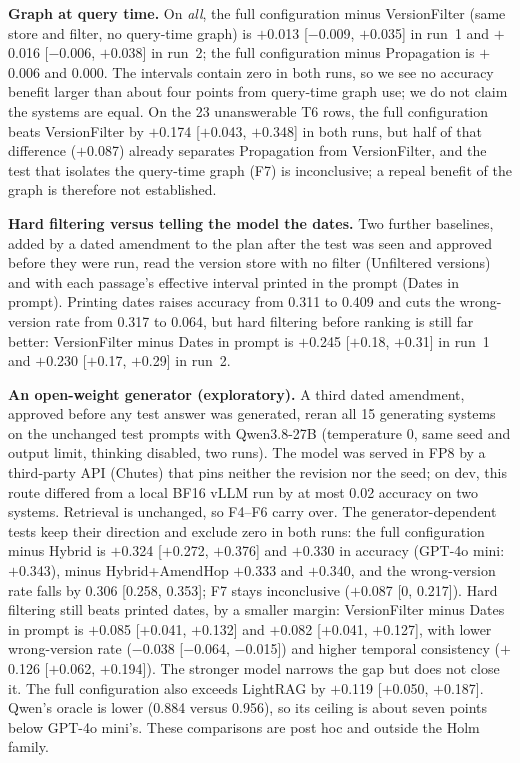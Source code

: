 \documentclass[sigconf,anonymous,review]{acmart}
\newcommand{\sys}[1]{\textsf{#1}}
\begin{document}
\textbf{Graph at query time.} On \textit{all}, the full configuration minus \sys{VersionFilter} (same store and filter, no query-time graph) is $+$0.013 [$-$0.009, $+$0.035] in run~1 and $+$0.016 [$-$0.006, $+$0.038] in run~2; the full configuration minus \sys{Propagation} is $+$0.006 and 0.000. The intervals contain zero in both runs, so we see no accuracy benefit larger than about four points from query-time graph use; we do not claim the systems are equal. On the 23 unanswerable T6 rows, the full configuration beats \sys{VersionFilter} by $+$0.174 [$+$0.043, $+$0.348] in both runs, but half of that difference ($+$0.087) already separates \sys{Propagation} from \sys{VersionFilter}, and the test that isolates the query-time graph (F7) is inconclusive; a repeal benefit of the graph is therefore not established.

\textbf{Hard filtering versus telling the model the dates.} Two further baselines, added by a dated amendment to the plan after the test was seen and approved before they were run, read the version store with no filter (\sys{Unfiltered versions}) and with each passage's effective interval printed in the prompt (\sys{Dates in prompt}). Printing dates raises accuracy from 0.311 to 0.409 and cuts the wrong-version rate from 0.317 to 0.064, but hard filtering before ranking is still far better: \sys{VersionFilter} minus \sys{Dates in prompt} is $+$0.245 [$+$0.18, $+$0.31] in run~1 and $+$0.230 [$+$0.17, $+$0.29] in run~2.

\textbf{An open-weight generator (exploratory).}\label{sec:qwen} A third dated amendment, approved before any test answer was generated, reran all 15 generating systems on the unchanged test prompts with Qwen3.8-27B (temperature 0, same seed and output limit, thinking disabled, two runs). The model was served in FP8 by a third-party API (Chutes) that pins neither the revision nor the seed; on dev, this route differed from a local BF16 vLLM run by at most 0.02 accuracy on two systems. Retrieval is unchanged, so F4--F6 carry over. The generator-dependent tests keep their direction and exclude zero in both runs: the full configuration minus \sys{Hybrid} is $+$0.324 [$+$0.272, $+$0.376] and $+$0.330 in accuracy (GPT-4o mini: $+$0.343), minus \sys{Hybrid+AmendHop} $+$0.333 and $+$0.340, and the wrong-version rate falls by 0.306 [0.258, 0.353]; F7 stays inconclusive ($+$0.087 [0, 0.217]). Hard filtering still beats printed dates, by a smaller margin: \sys{VersionFilter} minus \sys{Dates in prompt} is $+$0.085 [$+$0.041, $+$0.132] and $+$0.082 [$+$0.041, $+$0.127], with lower wrong-version rate ($-$0.038 [$-$0.064, $-$0.015]) and higher temporal consistency ($+$0.126 [$+$0.062, $+$0.194]). The stronger model narrows the gap but does not close it. The full configuration also exceeds LightRAG by $+$0.119 [$+$0.050, $+$0.187]. Qwen's oracle is lower (0.884 versus 0.956), so its ceiling is about seven points below GPT-4o mini's. These comparisons are post hoc and outside the Holm family.
\end{document}
